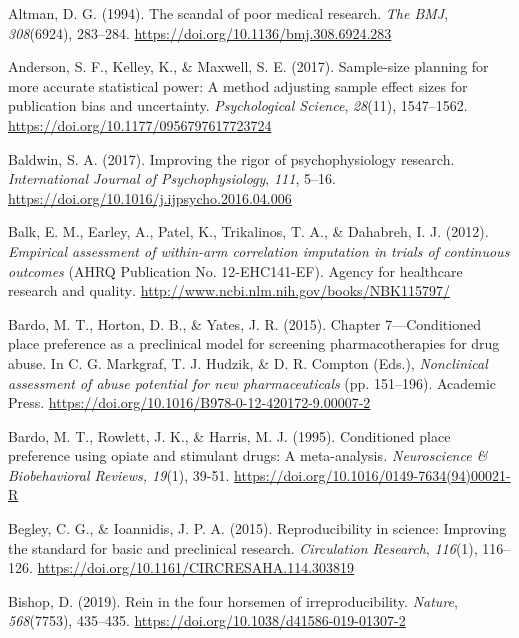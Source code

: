 \documentclass[authordate, meta]{jote-new-article}
\begin{document}
	Altman, D. G. (1994). The scandal of poor medical research. \emph{The BMJ}, \emph{308}(6924), 283--284. \url{https://doi.org/10.1136/bmj.308.6924.283}



	Anderson, S. F., Kelley, K., \& Maxwell, S. E. (2017). Sample-size planning for more accurate statistical power: A method adjusting sample effect sizes for publication bias and uncertainty. \emph{Psychological Science}, \emph{28}(11), 1547--1562. \url{https://doi.org/10.1177/0956797617723724}



	Baldwin, S. A. (2017). Improving the rigor of psychophysiology research. \emph{International Journal of Psychophysiology}, \emph{111}, 5--16. \url{https://doi.org/10.1016/j.ijpsycho.2016.04.006}



	Balk, E. M., Earley, A., Patel, K., Trikalinos, T. A., \& Dahabreh, I. J. (2012).\emph{\textbf{ }}\emph{Empirical assessment of within-arm correlation imputation in trials of continuous outcomes} (AHRQ Publication No. 12-EHC141-EF). Agency for healthcare research and quality\emph{.} \url{http://www.ncbi.nlm.nih.gov/books/NBK115797/}



	Bardo, M. T., Horton, D. B., \& Yates, J. R. (2015). Chapter 7—Conditioned place preference as a preclinical model for screening pharmacotherapies for drug abuse. In C. G. Markgraf, T. J. Hudzik, \& D. R. Compton (Eds.), \emph{Nonclinical assessment of abuse potential for new pharmaceuticals} (pp. 151--196). Academic Press. \url{https://doi.org/10.1016/B978-0-12-420172-9.00007-2}



	Bardo, M. T., Rowlett, J. K., \& Harris, M. J. (1995). Conditioned place preference using opiate and stimulant drugs: A meta-analysis\emph{.} \emph{Neuroscience \& Biobehavioral Reviews, 19}(1), 39-51. \url{https://doi.org/10.1016/0149-7634(94)00021-R}



	Begley, C. G., \& Ioannidis, J. P. A. (2015). Reproducibility in science: Improving the standard for basic and preclinical research. \emph{Circulation Research}, \emph{116}(1), 116--126. \url{https://doi.org/10.1161/CIRCRESAHA.114.303819}



	Bishop, D. (2019). Rein in the four horsemen of irreproducibility. \emph{Nature}, \emph{568}(7753), 435--435. \url{https://doi.org/10.1038/d41586-019-01307-2}
\end{document}
